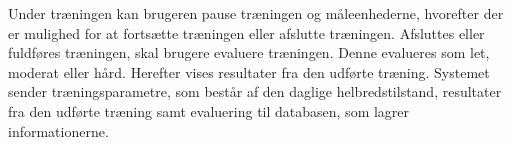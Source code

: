 Under træningen kan brugeren pause træningen og måleenhederne, hvorefter der er mulighed for at fortsætte træningen eller afslutte træningen. Afsluttes eller fuldføres træningen, skal brugere evaluere træningen. Denne evalueres som let, moderat eller hård. Herefter vises resultater fra den udførte træning. Systemet sender træningsparametre, som består af den daglige helbredstilstand, resultater fra den udførte træning samt evaluering til databasen, som lagrer informationerne. 